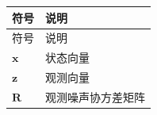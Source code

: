 \clearpage{}
\begin{longtable}{@{}p{}p{}@{}}
\toprule 符号 & 说明\\\midrule\endfirsthead
\toprule 符号 & 说明\\\midrule\endhead
\bottomrule\endfoot
$\mathbf{x}$ & 状态向量\\
$\mathbf{z}$ & 观测向量\\
$\mathbf{R}$ & 观测噪声协方差矩阵\\
\end{longtable}
